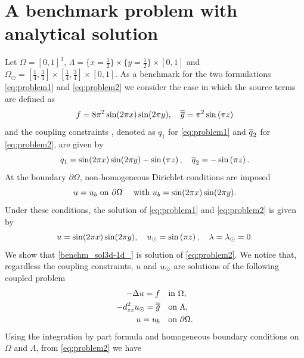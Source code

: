 \documentclass[r]{siamart171218}
\newcommand{\fede}[1]{{\color{green!55!blue}#1}}
\begin{document}
\section{A benchmark problem with analytical solution}
\fede{Let $\Omega=[0,1]^3$, $\Lambda=\{x=\tfrac{1}{2}\}\times \{y=\tfrac{1}{2}\} \times [0,1] $
and $\Omega_{\ominus}=[\tfrac{1}{4}, \tfrac{3}{4}]\times [\tfrac{1}{4}, \tfrac{3}{4}]\times [0, 1]$.
As a benchmark for the two formulations \eqref{eq:problem1} and \eqref{eq:problem2} we consider the case in which the source terms are defined as
\begin{equation*}
f=8\pi ^2 \sin (2\pi x) \sin (2\pi y),\quad \overline{\overline{g}}={\pi ^2}\sin \left({\pi z}\right)
\end{equation*}
and the coupling constraints , denoted as $q_1$ for \eqref{eq:problem1} and $\overline{q}_2$ for \eqref{eq:problem2}, are given by
\begin{equation*}
q_1=\sin (2\pi x) \sin (2\pi y) - \sin \left({\pi z}\right),\quad \overline{q}_2=-\sin \left({\pi z}\right).
\end{equation*}
At the boundary $\partial \Omega$, non-homogeneous Dirichlet conditions are imposed 
\begin{equation*}
u=u_b \text{ on $\partial \Omega$ \quad with $u_b=\sin (2\pi x) \sin (2\pi y)$}.
\end{equation*}
Under these conditions, the solution of \eqref{eq:problem1} and \eqref{eq:problem2} is given by
\begin{equation}
\label{benchm_sol3d-1d_}
u=\sin (2\pi x) \sin (2\pi y),
\quad
\ud=\sin \left({\pi z}\right),
\quad
\lambda = \ld = 0.
\end{equation}
We show that \eqref{benchm_sol3d-1d_} is solution of \eqref{eq:problem2}. We notice that, regardless the coupling constraints, $u$ and $u_{\odot}$ are solutions of the following coupled problem
\begin{subequations}\label{benchmark_}
\begin{align}
\label{benchm_3d_}
-\Delta u=f \quad &\text{in $\Omega$},\\
\label{benchm_1d_}
-d_{zz}^2 \ud =\avrd{g} \quad &\text{on $\Lambda$},\\
u=u_b \quad &\text{on $\partial \Omega$}.
\end{align}
\end{subequations}
Using the integration by part formula and homogeneous
boundary conditions on $\Omega$ and $\Lambda$, from \eqref{eq:problem2} we have
\begin{align*}

\end{align*}}
\end{document}
